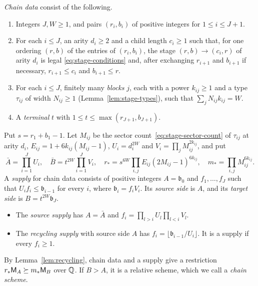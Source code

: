 \begin{definition}\label{def:class}
\emph{Chain data} consist of the following.
\begin{enumerate}
\item[(a)] Integers \(J,W\ge1\), and pairs \((r_i,b_i)\) of positive
integers for \(1\le i\le J+1\).
\item[(b)] For each \(i\le J\), an arity \(d_i\ge2\) and a child length
\(c_i\ge1\) such that, for one ordering \((r,b)\) of the entries of
\((r_i,b_i)\), the stage \((r,b)\to(c_i,r)\) of arity \(d_i\) is legal
\eqref{eq:stage-conditions} and, after exchanging \(r_{i+1}\) and
\(b_{i+1}\) if necessary, \(r_{i+1}\le c_i\) and \(b_{i+1}\le r\).
\item[(c)] For each \(i\le J\), finitely many \emph{blocks} \(j\), each
with a power \(k_{ij}\ge1\) and a type \(\tau_{ij}\) of width
\(N_{ij}\ge1\) (Lemma~\ref{lem:stage-types}), such that
\(\sum_jN_{ij}k_{ij}=W\).
\item[(d)] A \emph{terminal} \(t\) with \(1\le t\le\max(r_{J+1},b_{J+1})\).
\end{enumerate}
Put \(s=r_1+b_1-1\). Let \(M_{ij}\) be the sector
count~\eqref{eq:stage-sector-count} of \(\tau_{ij}\) at arity \(d_i\),
\(E_{ij}=1+6k_{ij}(M_{ij}-1)\), \(U_i=d_i^{2W}\) and
\(V_i=\prod_jM_{ij}^{2k_{ij}}\), and put
\begin{equation}\label{eq:class-counts}
 \bar A=\prod_{i=1}^JU_i,\quad
 \bar B=t^{2W}\prod_{i=1}^JV_i,\quad
 r_*=s^{6W}\prod_{i,j}E_{ij}(2M_{ij}-1)^{6k_{ij}},\quad
 m_*=\prod_{i,j}M_{ij}^{6k_{ij}} .
\end{equation}
A \emph{supply} for chain data consists of positive integers
\(A=\mathfrak b_0\) and \(f_1,\ldots,f_J\) such that \(U_if_i\le\mathfrak b_{i-1}\)
for every \(i\), where \(\mathfrak b_i=f_iV_i\). Its \emph{source side} is
\(A\), and its \emph{target side} is \(B=t^{2W}\mathfrak b_J\).
\begin{itemize}
\item The \emph{source supply} has \(A=\bar A\) and
\(f_i=\prod_{l>i}U_l\prod_{l<i}V_l\).
\item The \emph{recycling supply} with source side \(A\) has
\(f_i=\lfloor\mathfrak b_{i-1}/U_i\rfloor\). It is a supply if every
\(f_i\ge1\).
\end{itemize}
By Lemma~\ref{lem:recycling}, chain data and a supply give a restriction
\(r_*\mathsf M_A\succeq m_*\mathsf M_B\) over \(\mathbb Q\). If \(B>A\), it is a relative
scheme, which we call a \emph{chain scheme}.
\end{definition}

